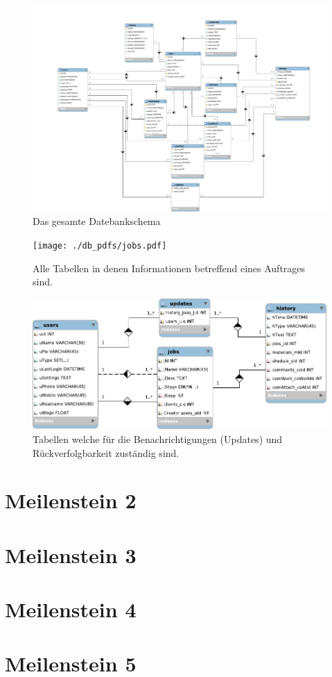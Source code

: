 \documentclass[ngerman, 12pt, pdftex]{scrartcl}[2006/07/30]
\begin{document}
\begin{figure}[p]
	\centering
	\includegraphics[scale=0.4]{./db_pdfs/everything.pdf}
	\caption{Das gesamte Datebankschema}
\end{figure}

\begin{figure}[p]
	\centering
	\texttt{[image: ./db\_pdfs/jobs.pdf]}
	\caption{Alle Tabellen in denen Informationen betreffend eines Auftrages sind.}
\end{figure}

\begin{figure}[hbt]
	\centering
	\includegraphics[scale=0.9]{./db_pdfs/history.pdf}
	\caption{Tabellen welche für die Benachrichtigungen (Updates) und Rückverfolgbarkeit zuständig sind.}
\end{figure}

\newpage
\section{Meilenstein 2}

\newpage
\section{Meilenstein 3}

\newpage
\section{Meilenstein 4}

\newpage
\section{Meilenstein 5}
\end{document}

